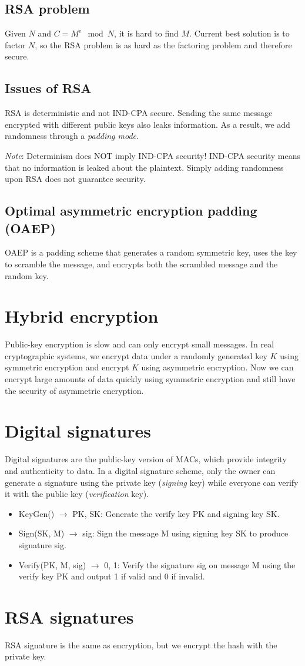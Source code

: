 \subsection{RSA problem}
Given $N$ and $C=M^e \mod{N}$, it is hard to find $M$. Current best solution is to factor $N$, so the RSA problem is as hard as the factoring problem and therefore secure.

\subsection{Issues of RSA}
RSA is deterministic and not IND-CPA secure.  Sending the same message encrypted with different public keys also leaks information. As a result, we add randomness through a \emph{padding mode}.

\medskip
\emph{Note}: Determinism does NOT imply IND-CPA security! IND-CPA security means that no information is leaked about the plaintext. Simply adding randomness upon RSA does not guarantee security.

\subsection{Optimal asymmetric encryption padding (OAEP)}
OAEP is a padding scheme that generates a random symmetric key, uses the key to scramble the message, and encrypts both the scrambled message and the random key. 

\section{Hybrid encryption}
Public-key encryption is slow and can only encrypt small messages. In real cryptographic systems, we encrypt data under a randomly generated key $K$ using symmetric encryption and encrypt $K$ using asymmetric encryption. Now we can encrypt large amounts of data quickly using symmetric encryption and still have the security of asymmetric encryption.

\section{Digital signatures}
Digital signatures are the public-key version of MACs, which provide integrity and authenticity to data. In a digital signature scheme, only the owner can generate a signature using the private key (\emph{signing} key) while everyone can verify it with the public key (\emph{verification} key).

\begin{itemize}
    \item KeyGen() $\rightarrow$ PK, SK: Generate the verify key PK and signing key SK.
    \item Sign(SK, M) $\rightarrow$ sig: Sign the message M using signing key SK to produce signature sig.
    \item Verify(PK, M, sig) $\rightarrow$ {0, 1}: Verify the signature sig on message M using the verify key PK and output 1 if valid and 0 if invalid.
\end{itemize}

\section{RSA signatures}
RSA signature is the same as encryption, but we encrypt the hash with the private key.